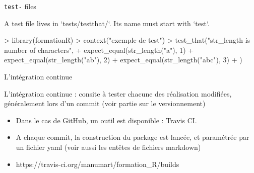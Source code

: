 \documentclass[12pt,handout]{beamer}
\begin{document}
\begin{frame}[fragile]{\texttt{test-} files}

A test file lives in `tests/testthat/`. Its name must start with `test`. 

\begin{Schunk}
\begin{Sinput}
> library(formationR)
> context("exemple de test")
> test_that("str_length is number of characters", {
+   expect_equal(str_length("a"), 1)
+   expect_equal(str_length("ab"), 2)
+   expect_equal(str_length("abc"), 3)
+ })
\end{Sinput}
\end{Schunk}

\end{frame}



\begin{frame}[fragile]{L'intégration continue}

\alert{L'intégration continue : consite à tester chacune des réalisation modifiées, généralement lors d'un commit (voir partie sur le versionnement)}

\begin{itemize}
\item Dans le cas de GitHub, un outil est disponible : Travis CI.
\item A chaque commit, la construction du package est lancée, et paramétrée par un fichier yaml (voir aussi les entêtes de fichiers markdown)
\item https://travis-ci.org/manumart/formation\_R/builds
\end{itemize}

\end{frame}

\end{document}
